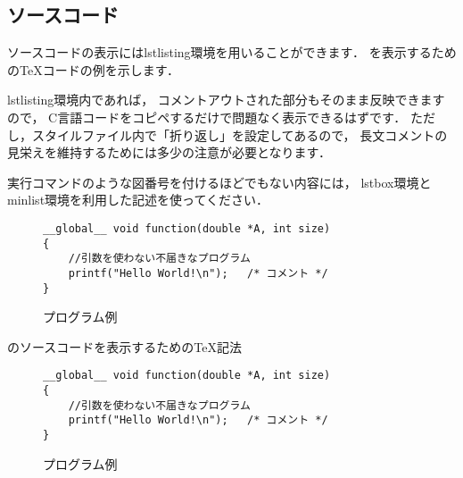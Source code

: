 \subsection{ソースコード}
ソースコードの表示にはlstlisting環境を用いることができます．
を表示するためのTeXコードの例を示します．

lstlisting環境内であれば，
コメントアウトされた部分もそのまま反映できますので，
C言語コードをコピペするだけで問題なく表示できるはずです．
ただし，スタイルファイル内で「折り返し」を設定してあるので，
長文コメントの見栄えを維持するためには多少の注意が必要となります．

実行コマンドのような図番号を付けるほどでもない内容には，
lstbox環境とminlist環境を利用した記述を使ってください．
%
\begin{figure}[ht] 
\begin{lstlisting}
__global__ void function(double *A, int size)
{
	//引数を使わない不届きなプログラム 
	printf("Hello World!\n");	/* コメント */
}
\end{lstlisting}
\caption{プログラム例}
\label{fig:hello}
\end{figure} 
\begin{lstbox}{のソースコードを表示するためのTeX記法}
\begin{minilst}
\begin{figure}[ht] %
\begin{lstlisting}
__global__ void function(double *A, int size)
{
	//引数を使わない不届きなプログラム
	printf("Hello World!\n");	/* コメント */
}	
\end{lstlisting}
\caption{プログラム例}
\label{fig:hello}
\end{figure} %
\end{minilst}
\end{lstbox}
